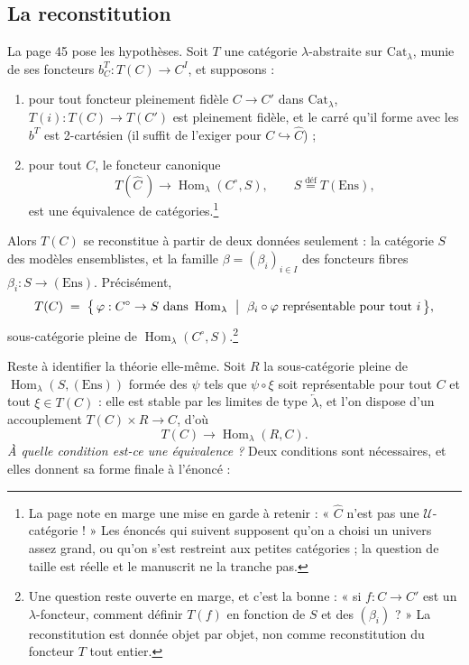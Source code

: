 \documentclass[11pt,a4paper]{article}
\begin{document}
\subsection*{La reconstitution}

La page 45 pose les hypothèses. Soit $T$ une catégorie $\lambda$-abstraite sur
$\mathrm{Cat}_{\lambda}$, munie de ses foncteurs $b^{T}_{C} : T(C) \to C^{I}$,
et supposons :

\begin{enumerate}
\item[a)] pour tout foncteur pleinement fidèle $C \to C'$ dans
$\mathrm{Cat}_{\lambda}$, $T(i) : T(C) \to T(C')$ est pleinement fidèle, et le
carré qu'il forme avec les $b^{T}$ est 2-cartésien (il suffit de l'exiger pour
$C \hookrightarrow \widehat{C}$) ;
\item[b)] pour tout $C$, le foncteur canonique
\[
T(\widehat{C}\,) \longrightarrow \operatorname{Hom}_{\lambda}(C^{\circ}, S),
\qquad S \overset{\text{déf}}{=} T(\mathrm{Ens}),
\]
est une équivalence de catégories.\footnote{La page note en marge une mise en
garde à retenir : « $\widehat{C}$ n'est pas une
$\mathcal{U}$-catégorie ! » Les énoncés qui suivent supposent qu'on a choisi un
univers assez grand, ou qu'on s'est restreint aux petites catégories ; la
question de taille est réelle et le manuscrit ne la tranche pas.}
\end{enumerate}

Alors $T(C)$ se reconstitue à partir de deux données seulement : la catégorie
$S$ des modèles ensemblistes, et la famille $\beta = (\beta_{i})_{i \in I}$ des
foncteurs fibres $\beta_{i} : S \to (\mathrm{Ens})$. Précisément,
\[
T(C) \;=\; \bigl\{\, \varphi : C^{\circ} \to S \ \text{dans}
\ \operatorname{Hom}_{\lambda} \ \bigm| \ \beta_{i} \circ \varphi
\ \text{représentable pour tout } i \,\bigr\},
\]
sous-catégorie pleine de $\operatorname{Hom}_{\lambda}(C^{\circ},
S)$.\footnote{Une question reste ouverte en marge, et c'est la bonne : « si
$f : C \to C'$ est un $\lambda$-foncteur, comment définir $T(f)$ en fonction de
$S$ et des $(\beta_{i})$ ? » La reconstitution est donnée objet par objet, non
comme reconstitution du foncteur $T$ tout entier.}

Reste à identifier la théorie elle-même. Soit $R$ la sous-catégorie pleine de
$\operatorname{Hom}_{\lambda}(S, (\mathrm{Ens}))$ formée des $\psi$ tels que
$\psi \circ \xi$ soit représentable pour tout $C$ et tout $\xi \in T(C)$ : elle
est stable par les limites de type $\underleftarrow{\lambda}$, et l'on dispose
d'un accouplement $T(C) \times R \to C$, d'où
\[
T(C) \longrightarrow \operatorname{Hom}_{\lambda}(R, C).
\]
\emph{À quelle condition est-ce une équivalence ?} Deux conditions sont
nécessaires, et elles donnent sa forme finale à l'énoncé :
\end{document}

